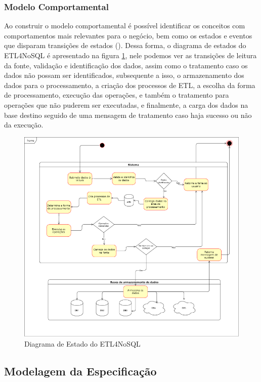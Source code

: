 \subsubsection{Modelo Comportamental}

Ao construir o modelo comportamental é possível identificar os conceitos com comportamentos mais relevantes para o negócio, bem como os estados e eventos que disparam transições de estados (\cite{itana:2005}). Dessa forma, o diagrama de estados do ETL4NoSQL é apresentado na figura \ref{diagrama_estado}, nele podemos ver as transições de leitura da fonte, validação e identificação dos dados, assim como o tratamento caso os dados não possam ser identificados, subsequente a isso, o armazenamento dos dados para o processamento, a criação dos processos de ETL, a escolha da forma de processamento, execução das operações, e também o tratamento para operações que não puderem ser executadas, e finalmente, a carga dos dados na base destino seguido de uma mensagem de tratamento caso haja sucesso ou não da execução.

\begin{figure}[h]
	\centering
	\includegraphics[scale=0.6]{fig/diagrama_estado.png}
	\caption{Diagrama de Estado do ETL4NoSQL}
	\label{diagrama_estado}
\end{figure}

\subsection{Modelagem da Especificação}

